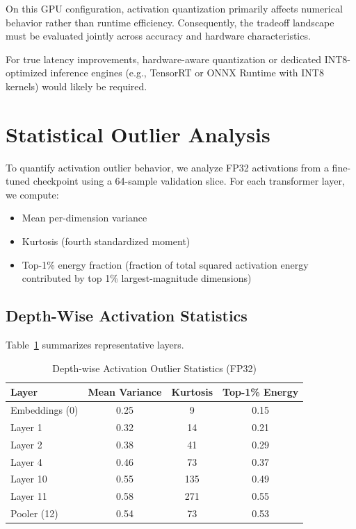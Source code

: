 \documentclass[conference]{IEEEtran}
\begin{document}
On this GPU configuration, activation quantization primarily affects numerical behavior rather than runtime efficiency. Consequently, the tradeoff landscape must be evaluated jointly across accuracy and hardware characteristics.

For true latency improvements, hardware-aware quantization or dedicated INT8-optimized inference engines (e.g., TensorRT or ONNX Runtime with INT8 kernels) would likely be required.

\section{Statistical Outlier Analysis}

To quantify activation outlier behavior, we analyze FP32 activations from a fine-tuned checkpoint using a 64-sample validation slice. For each transformer layer, we compute:

\begin{itemize}
\item Mean per-dimension variance
\item Kurtosis (fourth standardized moment)
\item Top-1\% energy fraction (fraction of total squared activation energy contributed by top 1\% largest-magnitude dimensions)
\end{itemize}

\subsection{Depth-Wise Activation Statistics}

Table~\ref{tab:outlier_stats} summarizes representative layers.

\begin{table}[t]
\centering
\caption{Depth-wise Activation Outlier Statistics (FP32)}
\label{tab:outlier_stats}
\begin{tabular}{lccc}
\toprule
Layer & Mean Variance & Kurtosis & Top-1\% Energy \\
\midrule
Embeddings (0) & 0.25 & 9 & 0.15 \\
Layer 1 & 0.32 & 14 & 0.21 \\
Layer 2 & 0.38 & 41 & 0.29 \\
Layer 4 & 0.46 & 73 & 0.37 \\
Layer 10 & 0.55 & 135 & 0.49 \\
Layer 11 & 0.58 & 271 & 0.55 \\
Pooler (12) & 0.54 & 73 & 0.53 \\
\bottomrule
\end{tabular}
\end{table}
\end{document}
